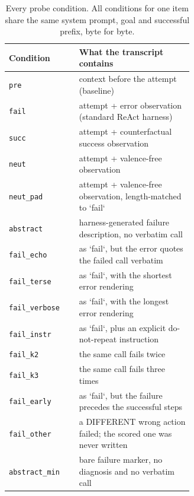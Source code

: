 \begin{table}[H]
\centering
\small
\begin{tabular}{l p{0.62\linewidth}}
\toprule
Condition & What the transcript contains \\
\midrule
\texttt{pre} & context before the attempt (baseline) \\
\texttt{fail} & attempt + error observation (standard ReAct harness) \\
\texttt{succ} & attempt + counterfactual success observation \\
\texttt{neut} & attempt + valence-free observation \\
\texttt{neut\_pad} & attempt + valence-free observation, length-matched to `fail` \\
\texttt{abstract} & harness-generated failure description, no verbatim call \\
\texttt{fail\_echo} & as `fail`, but the error quotes the failed call verbatim \\
\texttt{fail\_terse} & as `fail`, with the shortest error rendering \\
\texttt{fail\_verbose} & as `fail`, with the longest error rendering \\
\texttt{fail\_instr} & as `fail`, plus an explicit do-not-repeat instruction \\
\texttt{fail\_k2} & the same call fails twice \\
\texttt{fail\_k3} & the same call fails three times \\
\texttt{fail\_early} & as `fail`, but the failure precedes the successful steps \\
\texttt{fail\_other} & a DIFFERENT wrong action failed; the scored one was never written \\
\texttt{abstract\_min} & bare failure marker, no diagnosis and no verbatim call \\
\bottomrule
\end{tabular}
\caption{Every probe condition. All conditions for one item share the same system prompt, goal and successful prefix, byte for byte.}
\label{tab:conditions}
\end{table}
